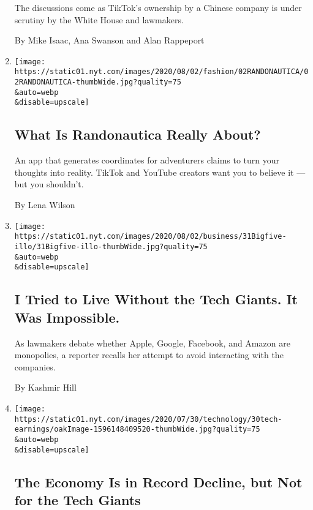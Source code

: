 \begin{enumerate}
  The discussions come as TikTok's ownership by a Chinese company is
  under scrutiny by the White House and lawmakers.

  By Mike Isaac, Ana Swanson and Alan Rappeport
\item
  \href{/2020/07/31/style/randonautica-app.html}{}

  \texttt{[image: https://static01.nyt.com/images/2020/08/02/fashion/02RANDONAUTICA/02RANDONAUTICA-thumbWide.jpg?quality=75\\\&auto=webp\\\&disable=upscale]}

  \hypertarget{what-is-randonautica-really-about}{%
  \subsection{What Is Randonautica Really
  About?}\label{what-is-randonautica-really-about}}

  An app that generates coordinates for adventurers claims to turn your
  thoughts into reality. TikTok and YouTube creators want you to believe
  it --- but you shouldn't.

  By Lena Wilson
\item
  \href{/2020/07/31/technology/blocking-the-tech-giants.html}{}

  \texttt{[image: https://static01.nyt.com/images/2020/08/02/business/31Bigfive-illo/31Bigfive-illo-thumbWide.jpg?quality=75\\\&auto=webp\\\&disable=upscale]}

  \hypertarget{i-tried-to-live-without-the-tech-giants-it-was-impossible}{%
  \subsection{I Tried to Live Without the Tech Giants. It Was
  Impossible.}\label{i-tried-to-live-without-the-tech-giants-it-was-impossible}}

  As lawmakers debate whether Apple, Google, Facebook, and Amazon are
  monopolies, a reporter recalls her attempt to avoid interacting with
  the companies.

  By Kashmir Hill
\item
  \href{/2020/07/30/technology/tech-company-earnings-amazon-apple-facebook-google.html}{}

  \texttt{[image: https://static01.nyt.com/images/2020/07/30/technology/30tech-earnings/oakImage-1596148409520-thumbWide.jpg?quality=75\\\&auto=webp\\\&disable=upscale]}

  \hypertarget{the-economy-is-in-record-decline-but-not-for-the-tech-giants}{%
  \subsection{The Economy Is in Record Decline, but Not for the Tech
  Giants}\label{the-economy-is-in-record-decline-but-not-for-the-tech-giants}}


\end{enumerate}

